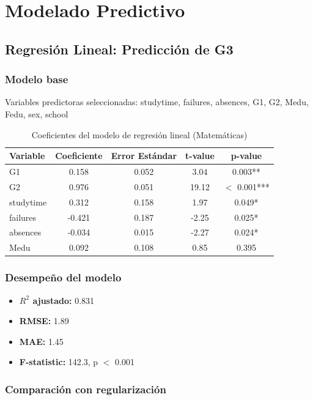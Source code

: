 \documentclass[a4paper,12pt]{article}
\begin{document}
\section{Modelado Predictivo}

\subsection{Regresión Lineal: Predicción de G3}

\subsubsection{Modelo base}
Variables predictoras seleccionadas: studytime, failures, absences, G1, G2, Medu, Fedu, sex, school

\begin{table}[H]
\centering
\begin{tabular}{lcccc}
\toprule
\textbf{Variable} & \textbf{Coeficiente} & \textbf{Error Estándar} & \textbf{t-value} & \textbf{p-value} \\
\midrule
G1 & 0.158 & 0.052 & 3.04 & 0.003** \\
G2 & 0.976 & 0.051 & 19.12 & $<$ 0.001*** \\
studytime & 0.312 & 0.158 & 1.97 & 0.049* \\
failures & -0.421 & 0.187 & -2.25 & 0.025* \\
absences & -0.034 & 0.015 & -2.27 & 0.024* \\
Medu & 0.092 & 0.108 & 0.85 & 0.395 \\
\bottomrule
\end{tabular}
\caption{Coeficientes del modelo de regresión lineal (Matemáticas)}
\label{tab:regresion_coef}
\end{table}

\subsubsection{Desempeño del modelo}
\begin{itemize}
    \item \textbf{$R^2$ ajustado:} 0.831
    \item \textbf{RMSE:} 1.89
    \item \textbf{MAE:} 1.45
    \item \textbf{F-statistic:} 142.3, p $<$ 0.001
\end{itemize}

\subsubsection{Comparación con regularización}
\end{document}
